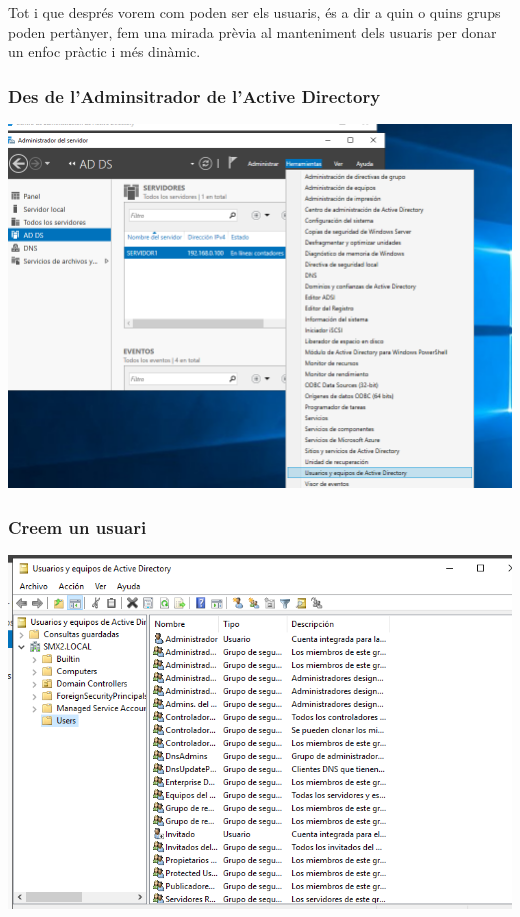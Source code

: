 \documentclass[
  a4paper,
]{article}
\begin{document}
Tot i que després vorem com poden ser els usuaris, és a dir a quin o
quins grups poden pertànyer, fem una mirada prèvia al manteniment dels
usuaris per donar un enfoc pràctic i més dinàmic.

\subsubsection{Des de l'Adminsitrador de l'Active
Directory}\label{des-de-ladminsitrador-de-lactive-directory}

\includegraphics{png/usuaris1.png}

\subsubsection{Creem un usuari}\label{creem-un-usuari}

\includegraphics{png/usuaris2.png}
\end{document}
